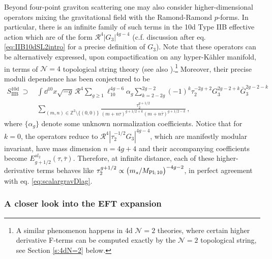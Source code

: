 Beyond four-point graviton scattering one may also consider higher-dimensional operators mixing the gravitational field with the Ramond-Ramond $p$-forms. In particular, there is an infinite family of such terms in the 10d Type IIB effective action which are of the form $\mathcal{R}^4 |G_3|^{4g-4}$ (c.f. discussion after eq. \eqref{eq:IIB10dSL2intro} for a precise definition of $G_3$). Note that these operators can be alternatively expressed, upon compactification on any hyper-K\"ahler manifold, in terms of $\mathcal{N}=4$ topological string theory \cite{Berkovits:1994vy} (see also \cite{Ooguri:1995cp}).\footnote{A similar phenomenon happens in 4d $\mathcal{N}=2$ theories, where certain higher derivative F-terms can be computed exactly by the $\mathcal{N}=2$ topological string, see Section \ref{s:4dN=2} below.} Moreover, their precise moduli dependence has been conjectured to be \cite{Berkovits:1998ex}
%
\begin{equation}\label{eq:BerkovitsVafa}
	\begin{aligned}
		S_\text{IIB}^{\text{10d}}\, \supset\, & \int \dd^{10}x\sqrt{-g}\, \mathcal{R}^4 \sum_{g\geq1} \ell_{10}^{4g-6} \alpha_{g} \sum_{k=2-2g}^{2g-2} (-1)^k \tau_2^{-2g+2}G_3^{2g-2+k} \bar{G}_3^{2g-2-k}\\
            &\sum_{(m, n) \in \mathbb{Z}^2 \setminus \lbrace (0,0) \rbrace} \frac{\tau_2^{g+1/2}}{\left( m+n\tau\right)^{g+1/2+k} \left( m+n \bar \tau\right)^{g+1/2-k}}\, ,
	\end{aligned}
\end{equation}
%
where $\{\alpha_g\}$ denote some unknown normalization coefficients. Notice that for $k=0$, the operators reduce to $\mathcal{R}^4 \left|\tau_2^{-1/2} G_3 \right|^{4g-4}$, which are manifestly modular invariant, have mass dimension $n=4g+4$ and their accompanying coefficients become $E_{g + 1/2}^{sl_2} (\tau, \bar \tau)$. Therefore, at infinite distance, each of these higher-derivative terms behaves like $\tau_2^{g +1/2} \propto \left(m_s/M_{\text{Pl;}\, 10} \right)^{-4g-2}$, in perfect agreement with eq. \eqref{eq:scalargravDlag}.

\subsubsection*{A closer look into the EFT expansion}

